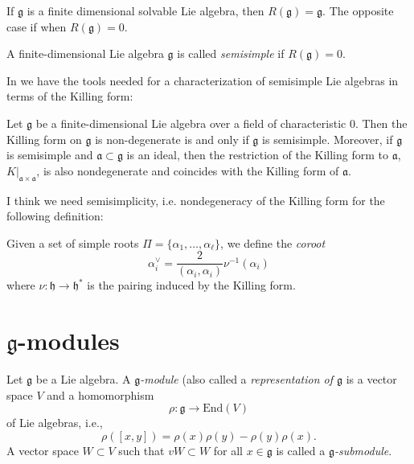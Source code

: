 If $\mathfrak{g}$ is a finite dimensional solvable Lie algebra,
then $R(\mathfrak{g})=\mathfrak{g}$. 
The opposite case if when $R(\mathfrak{g})=0$.

\begin{definition}
\label{definition-semisimple-Lie-algebra}
A finite-dimensional Lie algebra $\mathfrak{g}$ is called {\it semisimple} if
$R(\mathfrak{g})=0$.
\end{definition}

In \cite[Lecture 11]{KLAL} we have the tools needed for a characterization
of semisimple Lie algebras in terms of the Killing form:

\begin{theorem}[Cartan]
\label{theorem-Cartan}
Let $\mathfrak{g}$ be a finite-dimensional Lie algebra
over a field of characteristic 0.
Then the Killing form on $\mathfrak{g}$ is non-degenerate is and only if
$\mathfrak{g}$ is semisimple.
Moreover, if $\mathfrak{g}$ is semisimple and $\mathfrak{a}\subset\mathfrak{g}$
is an ideal,
then the restriction of the Killing form to $\mathfrak{a}$,
$K|_{\mathfrak{a}\times\mathfrak{a}}$,
is also nondegenerate and coincides with the Killing form of $\mathfrak{a}$.
\end{theorem}

I think we need semisimplicity, i.e. nondegeneracy of the
Killing form for the following definition:

\begin{definition}
\label{definition-coroot}
Given a set of simple roots $\Pi=\{\alpha_1,\ldots,\alpha_\ell\}$,
we define the {\it coroot} 
\begin{equation}
\label{equation-coroot}
\alpha_i^\vee=\frac{2}{(\alpha_i,\alpha_i)}\nu^{-1}(\alpha_i)
\end{equation}
where $\nu:\mathfrak{h}\to\mathfrak{h}^*$ is the pairing
induced by the Killing form.
\end{definition}

\section{$\mathfrak{g}$-modules}
\label{section-g-modules}

\begin{definition}
\label{definition-g-module}
Let $\mathfrak{g}$ be a Lie algebra. A {\it $\mathfrak{g}$-module}
(also called a {\it representation of $\mathfrak{g}$}
is a vector space $V$ and a homomorphism
$$
\rho:\mathfrak{g}\to \text{End}(V)
$$
of Lie algebras, i.e.,
$$
\rho([x,y])=\rho(x)\rho(y)-\rho(y)\rho(x).
$$
A vector space $W \subset V$ such that $vW\subset W$ for all
$x \in \mathfrak{g}$ is called a
 {\it $\mathfrak{g}$-submodule}.
\end{definition}

